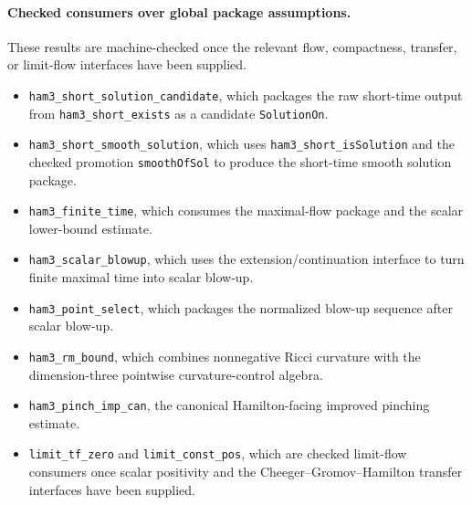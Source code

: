 \documentclass[11pt]{article}
\theoremstyle{plain}
\theoremstyle{definition}
\theoremstyle{remark}
\newcommand{\leanref}[1]{\nolinkurl{#1}}
\begin{document}
\paragraph{Checked consumers over global package assumptions.}
These results are machine-checked once the relevant flow, compactness, transfer,
or limit-flow interfaces have been supplied.
\begin{itemize}[leftmargin=2em]
  \item \leanref{ham3_short_solution_candidate}, which packages the raw
  short-time output from \leanref{ham3_short_exists} as a candidate
  \leanref{SolutionOn}.
  \item \leanref{ham3_short_smooth_solution}, which uses
  \leanref{ham3_short_isSolution} and the checked promotion
  \leanref{smoothOfSol} to produce the short-time smooth solution package.
  \item \leanref{ham3_finite_time}, which consumes the maximal-flow package and
  the scalar lower-bound estimate.
  \item \leanref{ham3_scalar_blowup}, which uses the extension/continuation
  interface to turn finite maximal time into scalar blow-up.
  \item \leanref{ham3_point_select}, which packages the normalized blow-up
  sequence after scalar blow-up.
  \item \leanref{ham3_rm_bound}, which combines nonnegative Ricci curvature
  with the dimension-three pointwise curvature-control algebra.
  \item \leanref{ham3_pinch_imp_can}, the canonical Hamilton-facing improved
  pinching estimate.
  \item \leanref{limit_tf_zero} and \leanref{limit_const_pos}, which are checked
  limit-flow consumers once scalar positivity and the Cheeger--Gromov--Hamilton
  transfer interfaces have been supplied.
\end{itemize}
\end{document}
